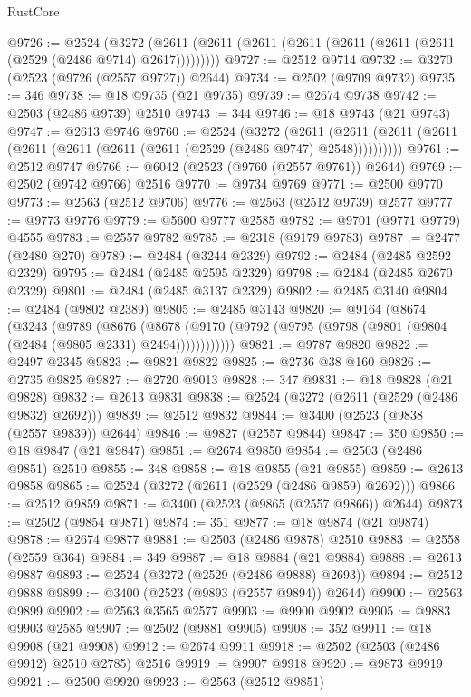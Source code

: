 \begin{lexlean}{RustCore}
\begin{coremodule}
@9726 := @2524
    (@3272 (@2611 (@2611 (@2611 (@2611 (@2611 (@2611 (@2611 (@2529 (@2486 @9714) @2617)))))))))
@9727 := @2512 @9714
@9732 := @3270 (@2523 (@9726 (@2557 @9727)) @2644)
@9734 := @2502 (@9709 @9732)
@9735 := 346
@9738 := @18 @9735 (@21 @9735)
@9739 := @2674 @9738
@9742 := @2503 (@2486 @9739) @2510
@9743 := 344
@9746 := @18 @9743 (@21 @9743)
@9747 := @2613 @9746
@9760 := @2524
    (@3272
      (@2611 (@2611 (@2611 (@2611 (@2611 (@2611 (@2611 (@2611 (@2529 (@2486 @9747) @2548))))))))))
@9761 := @2512 @9747
@9766 := @6042 (@2523 (@9760 (@2557 @9761)) @2644)
@9769 := @2502 (@9742 @9766) @2516
@9770 := @9734 @9769
@9771 := @2500 @9770
@9773 := @2563 (@2512 @9706)
@9776 := @2563 (@2512 @9739) @2577
@9777 := @9773 @9776
@9779 := @5600 @9777 @2585
@9782 := @9701 (@9771 @9779) @4555
@9783 := @2557 @9782
@9785 := @2318 (@9179 @9783)
@9787 := @2477 (@2480 @270)
@9789 := @2484 (@3244 @2329)
@9792 := @2484 (@2485 @2592 @2329)
@9795 := @2484 (@2485 @2595 @2329)
@9798 := @2484 (@2485 @2670 @2329)
@9801 := @2484 (@2485 @3137 @2329)
@9802 := @2485 @3140
@9804 := @2484 (@9802 @2389)
@9805 := @2485 @3143
@9820 := @9164
    (@8674
      (@3243
        (@9789
          (@8676
            (@8678 (@9170 (@9792 (@9795 (@9798 (@9801 (@9804 (@2484 (@9805 @2331) @2494))))))))))))
@9821 := @9787 @9820
@9822 := @2497 @2345
@9823 := @9821 @9822
@9825 := @2736 @38 @160
@9826 := @2735 @9825
@9827 := @2720 @9013
@9828 := 347
@9831 := @18 @9828 (@21 @9828)
@9832 := @2613 @9831
@9838 := @2524 (@3272 (@2611 (@2529 (@2486 @9832) @2692)))
@9839 := @2512 @9832
@9844 := @3400 (@2523 (@9838 (@2557 @9839)) @2644)
@9846 := @9827 (@2557 @9844)
@9847 := 350
@9850 := @18 @9847 (@21 @9847)
@9851 := @2674 @9850
@9854 := @2503 (@2486 @9851) @2510
@9855 := 348
@9858 := @18 @9855 (@21 @9855)
@9859 := @2613 @9858
@9865 := @2524 (@3272 (@2611 (@2529 (@2486 @9859) @2692)))
@9866 := @2512 @9859
@9871 := @3400 (@2523 (@9865 (@2557 @9866)) @2644)
@9873 := @2502 (@9854 @9871)
@9874 := 351
@9877 := @18 @9874 (@21 @9874)
@9878 := @2674 @9877
@9881 := @2503 (@2486 @9878) @2510
@9883 := @2558 (@2559 @364)
@9884 := 349
@9887 := @18 @9884 (@21 @9884)
@9888 := @2613 @9887
@9893 := @2524 (@3272 (@2529 (@2486 @9888) @2693))
@9894 := @2512 @9888
@9899 := @3400 (@2523 (@9893 (@2557 @9894)) @2644)
@9900 := @2563 @9899
@9902 := @2563 @3565 @2577
@9903 := @9900 @9902
@9905 := @9883 @9903 @2585
@9907 := @2502 (@9881 @9905)
@9908 := 352
@9911 := @18 @9908 (@21 @9908)
@9912 := @2674 @9911
@9918 := @2502 (@2503 (@2486 @9912) @2510 @2785) @2516
@9919 := @9907 @9918
@9920 := @9873 @9919
@9921 := @2500 @9920
@9923 := @2563 (@2512 @9851)

\end{coremodule}
\end{lexlean}
